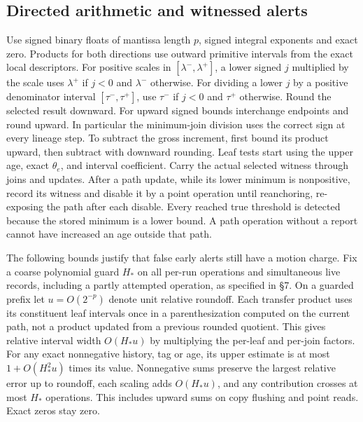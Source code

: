 \documentclass[11pt]{article}
\begin{document}
\hypertarget{directed-arithmetic-and-witnessed-alerts}{%
\subsection{Directed arithmetic and witnessed alerts}\label{directed-arithmetic-and-witnessed-alerts}}

Use signed binary floats of mantissa length \(p\), signed integral exponents and exact zero. Products for both directions use outward primitive intervals from the exact local descriptors. For positive scales in \([\lambda^-,\lambda^+]\), a lower signed \(j\) multiplied by the scale uses \(\lambda^+\) if \(j<0\) and \(\lambda^-\) otherwise. For dividing a lower \(j\) by a positive denominator interval \([\tau^-,\tau^+]\), use \(\tau^-\) if \(j<0\) and \(\tau^+\) otherwise. Round the selected result downward. For upward signed bounds interchange endpoints and round upward. In particular the minimum-join division uses the correct sign at every lineage step. To subtract the gross increment, first bound its product upward, then subtract with downward rounding. Leaf tests start using the upper age, exact \(\theta_e\), and interval coefficient. Carry the actual selected witness through joins and updates. After a path update, while its lower minimum is nonpositive, record its witness and disable it by a point operation until reanchoring, re-exposing the path after each disable. Every reached true threshold is detected because the stored minimum is a lower bound. A path operation without a report cannot have increased an age outside that path.

The following bounds justify that false early alerts still have a motion charge. Fix a coarse polynomial guard \(H_\ast\) on all per-run operations and simultaneous live records, including a partly attempted operation, as specified in §7. On a guarded prefix let \(u=O(2^{-p})\) denote unit relative roundoff. Each transfer product uses its constituent leaf intervals once in a parenthesization computed on the current path, not a product updated from a previous rounded quotient. This gives relative interval width \(O(H_\ast u)\) by multiplying the per-leaf and per-join factors. For any exact nonnegative history, tag or age, its upper estimate is at most \(1+O(H_\ast^2u)\) times its value. Nonnegative sums preserve the largest relative error up to roundoff, each scaling adds \(O(H_\ast u)\), and any contribution crosses at most \(H_\ast\) operations. This includes upward sums on copy flushing and point reads. Exact zeros stay zero.
\end{document}
